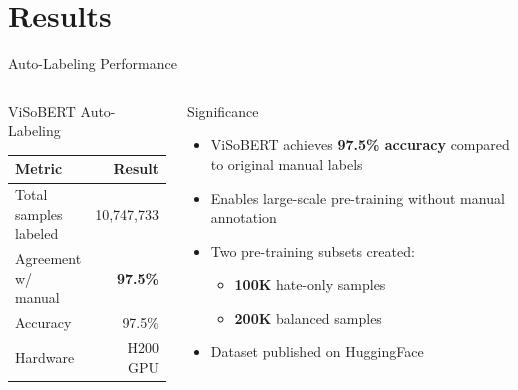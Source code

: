 \documentclass[10pt, aspectratio=169]{beamer}
\begin{document}
\section{Results}

\begin{frame}[shrink=5]{Auto-Labeling Performance}
  \begin{columns}[T]
    \begin{block}{ViSoBERT Auto-Labeling}
      \begin{table}[h]
        \centering
        \begin{tabular}{lr}
          \toprule
          \textbf{Metric} & \textbf{Result} \\
          \midrule
          Total samples labeled & 10,747,733 \\
          Agreement w/ manual   & \textbf{97.5\%} \\
          Accuracy              & 97.5\% \\
          Hardware               & H200 GPU \\
          \bottomrule
        \end{tabular}
      \end{table}
    \end{block}

    \begin{exampleblock}{Significance}
      \begin{itemize}
        \item ViSoBERT achieves \textbf{97.5\% accuracy} compared to original manual labels
        \item Enables large-scale pre-training without manual annotation
        \item Two pre-training subsets created:
          \begin{itemize}
            \item \textbf{100K} hate-only samples
            \item \textbf{200K} balanced samples
          \end{itemize}
        \item Dataset published on HuggingFace
      \end{itemize}
    \end{exampleblock}
  \end{columns}
\end{frame}
\end{document}
